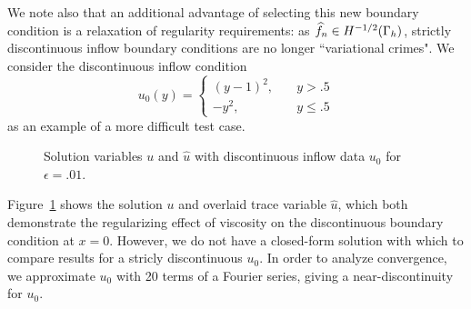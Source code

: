 We note also that an additional advantage of selecting this new boundary condition is a relaxation of regularity requirements: as $\widehat{f}_n \in H^{-1/2}(\Gh)$, strictly discontinuous inflow boundary conditions are no longer ``variational crimes".  We consider the discontinuous inflow condition
\[
u_0(y) = \begin{cases}
(y-1)^2, \quad &y>.5\\
-y^2, \quad &y\leq .5 
\end{cases}
\]
as an example of a more difficult test case. 

\begin{figure}[h!]
\centering
{}
\caption{Solution variables $u$ and $\widehat{u}$ with discontinuous inflow data $u_0$ for $\epsilon = .01$.}
\label{disc_sol}
\end{figure}
Figure~\ref{disc_sol} shows the solution $u$ and overlaid trace variable $\widehat{u}$, which both demonstrate the regularizing effect of viscosity on the discontinuous boundary condition at $x=0$. However, we do not have a closed-form solution with which to compare results for a stricly discontinuous $u_0$.  In order to analyze convergence, we approximate $u_0$ with 20 terms of a Fourier series, giving a near-discontinuity for $u_0$.  

